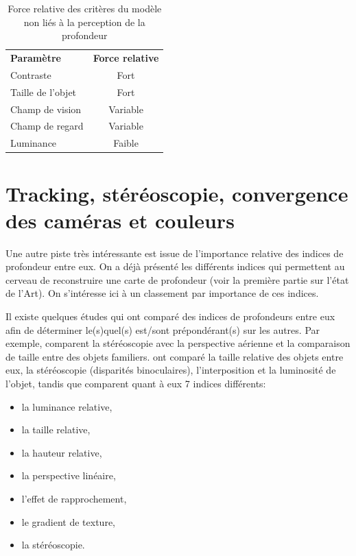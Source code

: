 \begin{table}[h]	
	\centering
	\caption{Force relative des critères du modèle non liés à la perception de la profondeur}
	\label{tab:ponderation_non_profondeur}
	\small
	\begin{tabular}{lc}
		\multicolumn{1}{l}{\bfseries Paramètre} & \multicolumn{1}{c}{\bfseries Force relative}\\		
		Contraste & Fort\\
		Taille de l'objet & Fort\\
		Champ de vision & Variable\\
		Champ de regard & Variable\\
		Luminance & Faible\\
	\end{tabular}
\end{table}

\section{Tracking, stéréoscopie, convergence des caméras et couleurs}
\par Une autre piste très intéressante est issue de l'importance relative des indices de profondeur entre eux. On a déjà présenté les différents indices qui permettent au cerveau de reconstruire une carte de profondeur (voir la première partie sur l'état de l'Art). On s'intéresse ici à un classement par importance de ces indices.

\par Il existe quelques études qui ont comparé des indices de profondeurs entre eux afin de déterminer le(s)quel(s) est/sont prépondérant(s) sur les autres. Par exemple, \citep{mazur_relative_1990} comparent la stéréoscopie avec la perspective aérienne et la comparaison de taille entre des objets familiers. \citep{reinhart_comparison_1990} ont comparé la taille relative des objets entre eux, la stéréoscopie (disparités binoculaires), l'interposition et la luminosité de l'objet, tandis que \citep{surdick_relevant_1994, surdick_perception_1997} comparent quant à eux 7 indices différents:

\begin{itemize}
	\item la luminance relative,
	\item la taille relative,
	\item la hauteur relative,
	\item la perspective linéaire,
	\item l'effet de rapprochement,
	\item le gradient de texture,
	\item la stéréoscopie.
\end{itemize}

